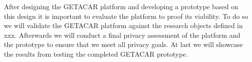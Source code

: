 After designing the GETACAR platform and developing a prototype based on this design it is important to evaluate the platform to proof its viability. To do so we will validate the GETACAR platform against the research objects defined in xxx. Afterwards we will conduct a final privacy assessment of the platform and the prototype to ensure that we meet all privacy goals. At last we will showcase the results from testing the completed GETACAR prototype. 
